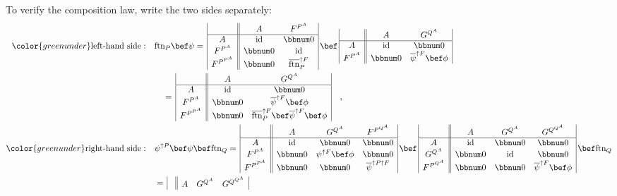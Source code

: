 To verify the composition law, write the two sides separately:
\begin{align*}
{\color{greenunder}\text{left-hand side}:}\quad & \text{ftn}_{P}\bef\psi=\,\begin{array}{|c||cc|}
 & A & F^{P^{A}}\\
\hline A & \text{id} & \bbnum 0\\
F^{P^{A}} & \bbnum 0 & \text{id}\\
F^{P^{P^{A}}} & \bbnum 0 & \overline{\text{ftn}}_{P}^{\uparrow F}
\end{array}\,\bef\,\begin{array}{|c||cc|}
 & A & G^{Q^{A}}\\
\hline A & \text{id} & \bbnum 0\\
F^{P^{A}} & \bbnum 0 & \overline{\psi}^{\uparrow F}\bef\phi
\end{array}\\
 & \quad=\,\begin{array}{|c||cc|}
 & A & G^{Q^{A}}\\
\hline A & \text{id} & \bbnum 0\\
F^{P^{A}} & \bbnum 0 & \overline{\psi}^{\uparrow F}\bef\phi\\
F^{P^{P^{A}}} & \bbnum 0 & \overline{\text{ftn}}_{P}^{\uparrow F}\bef\overline{\psi}^{\uparrow F}\bef\phi
\end{array}\quad,\\
{\color{greenunder}\text{right-hand side}:}\quad & \psi^{\uparrow P}\bef\psi\bef\text{ftn}_{Q}=\,\begin{array}{|c||ccc|}
 & A & G^{Q^{A}} & F^{P^{Q^{A}}}\\
\hline A & \text{id} & \bbnum 0 & \bbnum 0\\
F^{P^{A}} & \bbnum 0 & \psi^{\uparrow F}\bef\phi & \bbnum 0\\
F^{P^{P^{A}}} & \bbnum 0 & \bbnum 0 & \overline{\psi}^{\uparrow P\uparrow F}
\end{array}\,\bef\,\begin{array}{|c||ccc|}
 & A & G^{Q^{A}} & G^{Q^{Q^{A}}}\\
\hline A & \text{id} & \bbnum 0 & \bbnum 0\\
G^{Q^{A}} & \bbnum 0 & \text{id} & \bbnum 0\\
F^{P^{Q^{A}}} & \bbnum 0 & \bbnum 0 & \overline{\psi}^{\uparrow F}\bef\phi
\end{array}\,\bef\text{ftn}_{Q}\\
 & =\,\begin{array}{|c||ccc|}
 & A & G^{Q^{A}} & G^{Q^{Q^{A}}}\\

\end{array}
\end{align*}

